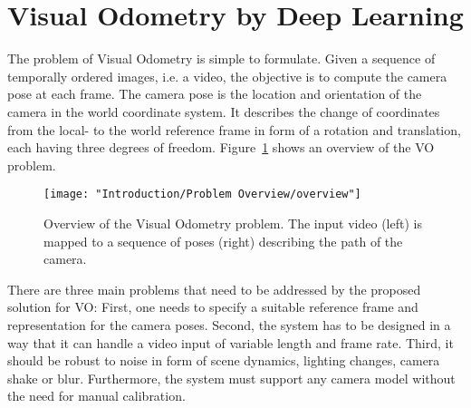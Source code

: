 		
		
		
		
		
		
		
	\section{Visual Odometry by Deep Learning}
		
		The problem of Visual Odometry is simple to formulate.
		Given a sequence of temporally ordered images, i.e. a video, the objective is to compute the camera pose at each frame.
		The camera pose is the location and orientation of the camera in the world coordinate system.
		It describes the change of coordinates from the local- to the world reference frame in form of a rotation and translation, each having three degrees of freedom.
		Figure~\ref{fig:overview-visual-odometry} shows an overview of the VO problem.
		\begin{figure}[t]
			\centering
			\texttt{[image: "Introduction/Problem Overview/overview"]}
			\caption[Description of the Visual Odometry problem]
					{Overview of the Visual Odometry problem.
					 The input video (left) is mapped to a sequence of poses (right) describing the path of the camera.
					 \label{fig:overview-visual-odometry}}
		\end{figure}
		
		There are three main problems that need to be addressed by the proposed solution for VO:
		First, one needs to specify a suitable reference frame and representation for the camera poses.
		Second, the system has to be designed in a way that it can handle a video input of variable length and frame rate.
		Third, it should be robust to noise in form of scene dynamics, lighting changes, camera shake or blur.
		Furthermore, the system must support any camera model without the need for manual calibration.
		
